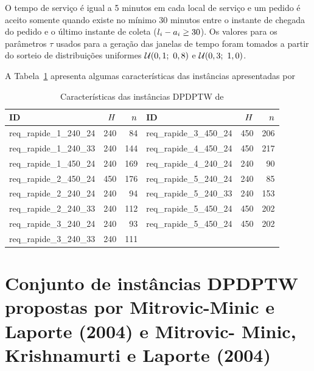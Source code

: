 O tempo de serviço é igual a 5 minutos em cada local de serviço e um pedido é 
aceito somente quando existe no mínimo 30 minutos entre o instante de chegada 
do pedido e o último instante de coleta 
($l_i - a_{i} \geq 30$). 
Os valores para os parâmetros $\tau$ usados para a geração das janelas de tempo
foram tomados a partir do sorteio de distribuições uniformes 
$\mathcal{U}(0,1;\ 0,8)$ e $\mathcal{U}(0,3;\ 1,0)$.

A Tabela~\ref{tab:gendreau2006_instances_characteristics} apresenta algumas
características das instâncias apresentadas por
\textcite{gendreau_neighborhood_2006}

\begin{table}[h]
\footnotesize
    \caption{Características das instâncias DPDPTW de 
             \textcite{gendreau_neighborhood_2006}}
    \label{tab:gendreau2006_instances_characteristics}
    \centering
    \begin{tabular}{lrr|lrr}
        \toprule
         ID & $H$ & $n$ & 
         ID & $H$ & $n$ \\
         \midrule
         req\_rapide\_1\_240\_24 & 240 &  84 & 
         req\_rapide\_3\_450\_24 & 450 & 206 \\ 
         req\_rapide\_1\_240\_33 & 240 & 144 & 
         req\_rapide\_4\_450\_24 & 450 & 217 \\
         req\_rapide\_1\_450\_24 & 240 & 169 & 
         req\_rapide\_4\_240\_24 & 240 &  90 \\ 
         req\_rapide\_2\_450\_24 & 450 & 176 &
         req\_rapide\_5\_240\_24 & 240 &  85 \\
         req\_rapide\_2\_240\_24 & 240 &  94 &
         req\_rapide\_5\_240\_33 & 240 & 153 \\
         req\_rapide\_2\_240\_33 & 240 & 112 &
         req\_rapide\_5\_450\_24 & 450 & 202 \\
         req\_rapide\_3\_240\_24 & 240 &  93 &
         req\_rapide\_5\_450\_24 & 450 & 202 \\
         req\_rapide\_3\_240\_33 & 240 & 111 &
                                 &     &     \\
         \bottomrule
  \end{tabular}
\end{table}





\section{Conjunto de instâncias DPDPTW propostas por 
         Mitrovic-Minic e Laporte (2004) e Mitrovic-
         Minic, Krishnamurti e Laporte (2004)}

